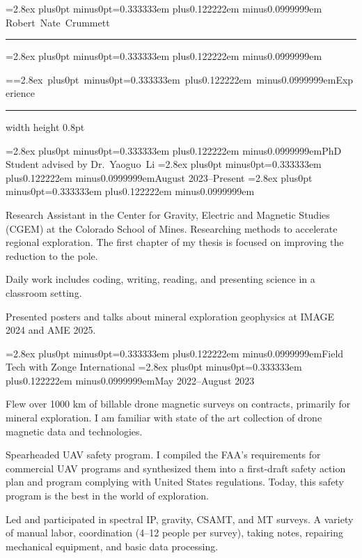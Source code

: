 



\frenchspacing
{}

\def\fontspacing{\baselineskip=2.8ex plus0pt minus0pt\spaceskip=0.333333em plus0.122222em minus0.0999999em}

\twentyrm
\fontspacing
\noindent
Robert~Nate~Crummett

\kern2pt
\hrule height 1pt
\smallskip

\eightrm
\fontspacing
{}
\bigskip

=\hbox{\sixteenrm\fontspacing Experience}
{}
\kern-1.5pt
\hrule width  height 0.8pt
\medskip

\noindent
{\twelverm\fontspacing PhD Student advised by Dr.~Yaoguo~Li}
\hfill{\eightit\fontspacing August 2023--Present}
\tenrm
\fontspacing

\kern-4pt
\beginenumerate
\item Research Assistant in the Center for Gravity, Electric and Magnetic Studies (CGEM) at the Colorado School of Mines.
Researching methods to accelerate regional exploration.
The first chapter of my thesis is focused on improving the reduction to the pole.
\item Daily work includes coding, writing, reading, and presenting science in a classroom setting.
\item Presented posters and talks about mineral exploration geophysics at IMAGE 2024 and AME 2025.
\endenumerate

\noindent
{\twelverm\fontspacing Field Tech with Zonge International}
\hfill{\eightit\fontspacing May 2022--August 2023}

\kern-4pt
\beginenumerate
\item Flew over 1000 km of billable drone magnetic surveys on contracts, primarily for mineral exploration.
I am familiar with state of the art collection of drone magnetic data and technologies.
\item Spearheaded UAV safety program.
I compiled the FAA's requirements for commercial UAV programs and synthesized them into a first-draft safety action plan and program complying with United States regulations.
Today, this safety program is the best in the world of exploration.
\item Led and participated in spectral IP, gravity, CSAMT, and MT surveys.
A variety of manual labor, coordination (4--12 people per survey), taking notes, repairing mechanical equipment, and basic data processing.
\endenumerate

